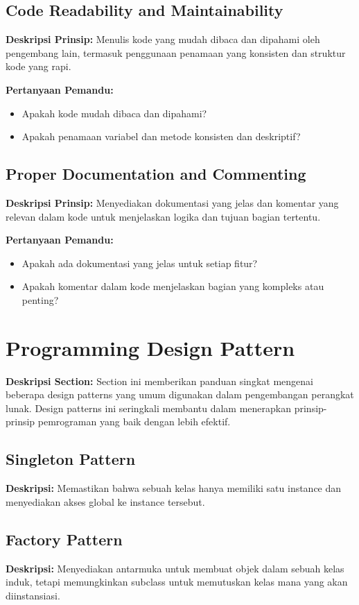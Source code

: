 \documentclass[12pt]{article}
\begin{document}
\subsection{Code Readability and Maintainability}
\textbf{Deskripsi Prinsip:} Menulis kode yang mudah dibaca dan dipahami oleh pengembang lain, termasuk penggunaan penamaan yang konsisten dan struktur kode yang rapi.

\textbf{Pertanyaan Pemandu:}
\begin{itemize}
    \item Apakah kode mudah dibaca dan dipahami?
    \item Apakah penamaan variabel dan metode konsisten dan deskriptif?
\end{itemize}

\subsection{Proper Documentation and Commenting}
\textbf{Deskripsi Prinsip:} Menyediakan dokumentasi yang jelas dan komentar yang relevan dalam kode untuk menjelaskan logika dan tujuan bagian tertentu.

\textbf{Pertanyaan Pemandu:}
\begin{itemize}
    \item Apakah ada dokumentasi yang jelas untuk setiap fitur?
    \item Apakah komentar dalam kode menjelaskan bagian yang kompleks atau penting?
\end{itemize}

\section{Programming Design Pattern}
\textbf{Deskripsi Section:} Section ini memberikan panduan singkat mengenai beberapa design patterns yang umum digunakan dalam pengembangan perangkat lunak. Design patterns ini seringkali membantu dalam menerapkan prinsip-prinsip pemrograman yang baik dengan lebih efektif.

\subsection{Singleton Pattern}
\textbf{Deskripsi:} Memastikan bahwa sebuah kelas hanya memiliki satu instance dan menyediakan akses global ke instance tersebut.

\subsection{Factory Pattern}
 \textbf{Deskripsi:} Menyediakan antarmuka untuk membuat objek dalam sebuah kelas induk, tetapi memungkinkan subclass untuk memutuskan kelas mana yang akan diinstansiasi.
\end{document}

